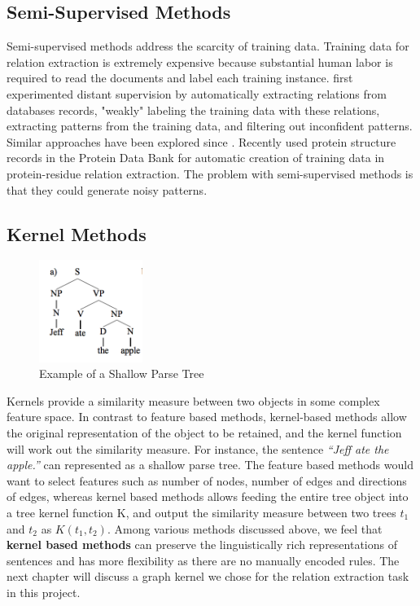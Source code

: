 \subsection{Semi-Supervised Methods}
Semi-supervised methods address the scarcity of training data. Training data for relation extraction is extremely expensive because substantial human labor is required to read the documents and label each training instance. \citet*{craven1999constructing} first experimented distant supervision by automatically extracting relations from databases records, "weakly" labeling the training data with these relations, extracting patterns from the training data, and filtering out inconfident patterns. Similar approaches have been explored since \cite{bunescu2007learning,min2013distant,mintz2009distant}. Recently \citet*{ravikumar2012literature} used protein structure records in the Protein Data Bank for automatic creation of training data in protein-residue relation extraction. The problem with semi-supervised methods is that they could generate noisy patterns\cite{nebhi2013rule}. 

\subsection{Kernel Methods}
\begin{figure}[h]
	\centering
	\includegraphics[width=0.3\textwidth]{shallow_parse_tree}
	\caption{Example of a Shallow Parse Tree \cite{zelenko2003kernel}}
	\label{fig:shallow_parse_tree}   
\end{figure} 
Kernels provide a similarity measure between two objects in some complex feature space. In contrast to feature based methods, kernel-based methods allow the original representation of the object to be retained, and the kernel function will work out the similarity measure. For instance, the sentence \emph{``Jeff ate the apple.''} can represented as a shallow parse tree\cite{zelenko2003kernel}. The feature based methods would want to select features such as number of nodes, number of edges and directions of edges, whereas kernel based methods allows feeding the entire tree object into a tree kernel function K\cite{collins2001convolution}, and output the similarity measure between two trees $t_{1}$ and $t_{2}$ as $K(t_{1}, t_{2})$. Among various methods discussed above, we feel that \textbf{kernel based methods} can preserve the linguistically rich representations of sentences and has more flexibility as there are no manually encoded rules. The next chapter will discuss a graph kernel we chose for the relation extraction task in this project.

